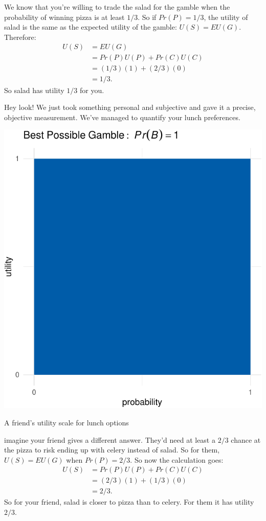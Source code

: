 \documentclass[justified]{tufte-book}
\renewcommand{\u}{U}
\newcommand{\p}{Pr}
\newcommand{\EU}{EU}
\theoremstyle{definition}
\theoremstyle{definition}
\theoremstyle{definition}
\theoremstyle{remark}
\begin{document}
We know that you're willing to trade the salad for the gamble when the
probability of winning pizza is at least \(1/3\). So if \(\p(P) = 1/3\),
the utility of salad is the same as the expected utility of the gamble:
\(\u(S) = \EU(G)\). Therefore: \[
  \begin{aligned}
    \u(S) &= \EU(G)\\
      &= \p(P)\u(P) + \p(C)\u(C)\\
      &= (1/3)(1) + (2/3)(0)\\
      &= 1/3.
  \end{aligned}
\] So salad has utility \(1/3\) for you.

Hey look! We just took something personal and subjective and gave it a
precise, objective measurement. We've managed to quantify your lunch
preferences.

\begin{marginfigure}
\includegraphics{_main_files/figure-latex/unnamed-chunk-108-1} \caption[A friend's utility scale for lunch options]{A friend's utility scale for lunch options}\label{fig:unnamed-chunk-108}
\end{marginfigure}

 imagine your friend gives a different answer. They'd
need at least a \(2/3\) chance at the pizza to risk ending up with
celery instead of salad. So for them, \(\u(S) = \EU(G)\) when
\(\p(P) = 2/3\). So now the calculation goes: \[
  \begin{aligned}
    \u(S) &= \p(P)\u(P) + \p(C)\u(C)\\
      &= (2/3)(1) + (1/3)(0)\\
      &= 2/3.
  \end{aligned}
\] So for your friend, salad is closer to pizza than to celery. For them
it has utility \(2/3\).
\end{document}
